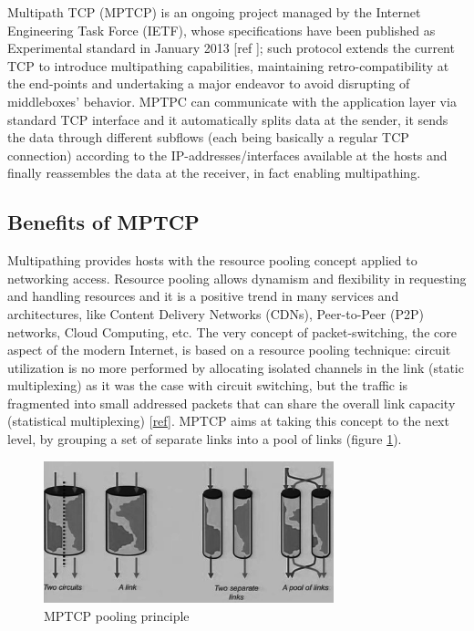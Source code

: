 Multipath TCP (MPTCP) is an ongoing project managed by the Internet Engineering Task Force (IETF), whose specifications have been published as Experimental standard in January 2013 [ref ]; such protocol extends the current TCP to introduce multipathing capabilities, maintaining retro-compatibility at the end-points and undertaking a major endeavor to avoid disrupting of middleboxes' behavior. MPTPC can communicate with the application layer via standard TCP interface and it automatically splits data at the sender, it sends the data through different subflows (each being basically a regular TCP connection) according to the IP-addresses/interfaces available at the hosts and finally reassembles the data at the receiver, in fact enabling multipathing.

\subsection{Benefits of MPTCP}
Multipathing provides hosts with the resource pooling concept applied to networking access. Resource pooling allows dynamism and flexibility in requesting and handling resources and it is a positive trend in many services and architectures, like Content Delivery Networks (CDNs), Peer-to-Peer (P2P) networks, Cloud Computing, etc. The very concept of packet-switching, the core aspect of the modern Internet, is based on a resource pooling technique: circuit utilization is no more performed by allocating isolated channels in the link (static multiplexing) as it was the case with circuit switching, but the traffic is fragmented into small addressed packets that can share the overall link capacity (statistical multiplexing) [\href{https://www.cl.cam.ac.uk/~as2330/docs/multipath-survey.pdf}{ref}]. MPTCP aims at taking this concept to the next level, by grouping a set of separate links into a pool of links (figure \ref{fig:pooling}). 


\begin{figure}[!htb]
\centering
\includegraphics[width=0.75\textwidth]{images/pooling}
\caption{MPTCP pooling principle}
\label{fig:pooling}
\end{figure}


